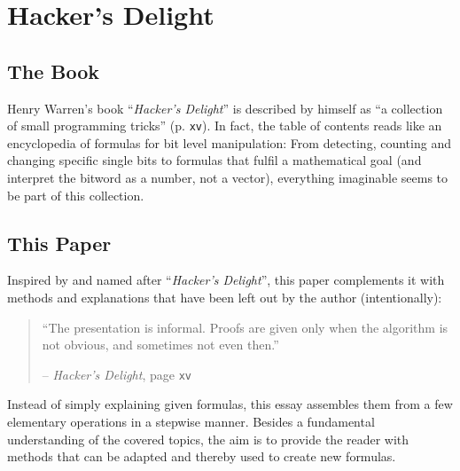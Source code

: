 \section{Hacker's Delight}\label{sec:book}


\subsection*{The Book}
Henry Warren's book ``\emph{Hacker's Delight}''
is described by himself as
``a collection of small programming tricks''
\cite{Warren:2012:HD:2462741} (p. \texttt{xv}).
In fact, the table of contents reads like
an encyclopedia of formulas for bit level manipulation:
From detecting, counting and changing specific single bits
to formulas that fulfil a mathematical goal
(and interpret the bitword as a number, not a vector),
everything imaginable seems to be part of this collection.


\subsection*{This Paper}
Inspired by and named after ``\emph{Hacker's Delight}'',
this paper complements it with methods and explanations
that have been left out by the author (intentionally):

\begin{quote}
``The presentation is informal.
Proofs are given only when the algorithm is not obvious,
and sometimes not even then.''

\hfill -- \emph{Hacker's Delight}, page \texttt{xv}
\cite{Warren:2012:HD:2462741}
\end{quote}

Instead of simply explaining given formulas,
this essay assembles them from a few elementary operations
in a stepwise manner.
Besides a fundamental understanding of the covered topics,
the aim is to provide the reader with methods
that can be adapted and thereby used to create new formulas.
